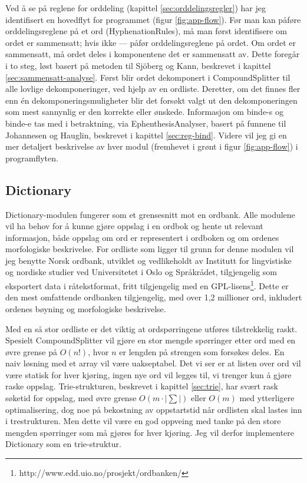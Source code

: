 Ved å se på reglene for orddeling (kapittel \ref{sec:orddelingsregler}) har jeg identifisert en hovedflyt for programmet (figur \ref{fig:app-flow}). Før man kan påføre orddelingsreglene på et ord (HyphenationRules), må man først identifisere om ordet er sammensatt; hvis ikke — påfør orddelingsreglene på ordet. Om ordet er sammensatt, må ordet deles i komponentene det er sammensatt av. Dette foregår i to steg, løst basert på metoden til Sjöberg og Kann, beskrevet i kapittel \ref{sec:sammensatt-analyse}. Først blir ordet dekomponert i CompoundSplitter til alle lovlige dekomponeringer, ved hjelp av en ordliste. Deretter, om det finnes fler enn én dekomponeringsmuligheter blir det forsøkt valgt ut den dekomponeringen som mest sannynlig er den korrekte eller ønskede. Informasjon om binde-s og binde-e tas med i betraktning, via EphenthesisAnalyser, basert på funnene til Johannesen og Hauglin, beskrevet i kapittel \ref{sec:reg-bind}. Videre vil jeg gi en mer detaljert beskrivelse av hver modul (fremhevet i grønt i figur \ref{fig:app-flow}) i programflyten.

\begin{SCfigure}[h]
\centering

\label{fig:app-flow}
\caption{Programflyt.}
\end{SCfigure}

\subsection{Dictionary}
\label{sec:dictionary}

Dictionary-modulen fungerer som et grensesnitt mot en ordbank. Alle modulene vil ha behov for å kunne gjøre oppslag i en ordbok og hente ut relevant informasjon, både oppslag om ord er representert i ordboken og om ordenes morfologiske beskrivelse. For ordliste som ligger til grunn for denne modulen vil jeg benytte Norsk ordbank, utviklet og vedlikeholdt av Institutt for lingvistiske og nordiske studier ved Universitetet i Oslo og Språkrådet, tilgjengelig som eksportert data i råtekstformat, fritt tilgjengelig med en GPL-lisens\footnote{http://www.edd.uio.no/prosjekt/ordbanken/}. Dette er den mest omfattende ordbanken tilgjengelig, med over 1,2 millioner ord, inkludert ordenes bøyning og morfologiske beskrivelse.

Med en så stor ordliste er det viktig at ordspørringene utføres tilstrekkelig raskt. Spesielt CompoundSplitter vil gjøre en stor mengde spørringer etter ord med en øvre grense på $O(n!)$, hvor $n$ er lengden på strengen som forsøkes deles. En naiv løsning med et array vil være uakseptabel. Det vi ser er at listen over ord vil være statisk for hver kjøring, ingen nye ord vil legges til, vi trenger kun å gjøre raske oppslag. Trie-strukturen, beskrevet i kapittel \ref{sec:trie}, har svært rask søketid for oppslag, med øvre grense $O(m\cdot |\sum|)$ eller $O(m)$ med ytterligere optimalisering, dog noe på bekostning av oppstartstid når ordlisten skal lastes inn i trestrukturen. Men dette vil være en god oppveing med tanke på den store mengden spørringer som må gjøres for hver kjøring. Jeg vil derfor implementere Dictionary som en trie-struktur.

